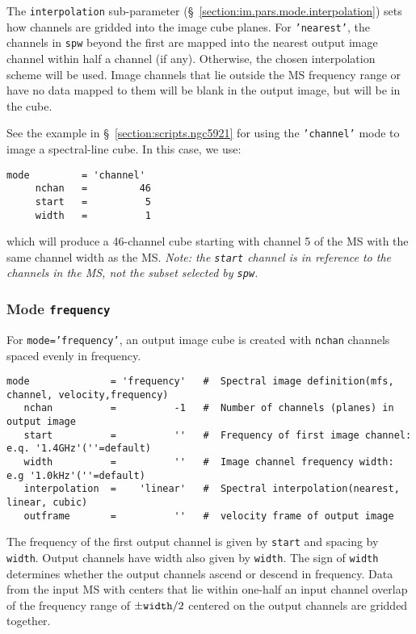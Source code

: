 The {\tt interpolation} sub-parameter
(\S~\ref{section:im.pars.mode.interpolation}) sets how channels are
gridded into the image cube planes.  For {\tt 'nearest'}, the
channels in {\tt spw} beyond the first are mapped
into the nearest output image channel within half a channel (if
any).  Otherwise, the chosen interpolation scheme will be used.
Image channels that lie outside the MS frequency range or
have no data mapped to them will be blank in the output image,
but will be in the cube.  

See the example in \S~\ref{section:scripts.ngc5921} for using the {\tt 'channel'}
mode to image a spectral-line cube. In this case, we use:
\small
\begin{verbatim}
mode         = 'channel'       
     nchan   =         46   
     start   =          5   
     width   =          1   
\end{verbatim}
\normalsize
which will produce a 46-channel cube starting with channel 5 of the MS
with the same channel width as the MS.  {\em Note: the {\tt start}
channel is in reference to the channels in the MS, not the subset
selected by {\tt spw}.}

\subsubsection{Mode {\tt frequency} }
\label{section:im.pars.mode.frequency}

For {\tt mode='frequency'}, an output image cube is created
with {\tt nchan} channels spaced evenly in frequency.
\small
\begin{verbatim}
mode              = 'frequency'   #  Spectral image definition(mfs, channel, velocity,frequency)
   nchan          =          -1   #  Number of channels (planes) in output image
   start          =          ''   #  Frequency of first image channel: e.q. '1.4GHz'(''=default)
   width          =          ''   #  Image channel frequency width: e.g '1.0kHz'(''=default)
   interpolation  =    'linear'   #  Spectral interpolation(nearest, linear, cubic)
   outframe       =          ''   #  velocity frame of output image
\end{verbatim}
\normalsize
The frequency of the first output channel is given by {\tt start}
and spacing by {\tt width}.  Output channels have width also given by {\tt width}.
The sign of {\tt width}
determines whether the output channels ascend or descend in
frequency.  Data from the input MS with centers that lie within one-half an input
channel overlap of the frequency range of $\pm{\tt width}/2$ centered
on the output channels are gridded together.  

